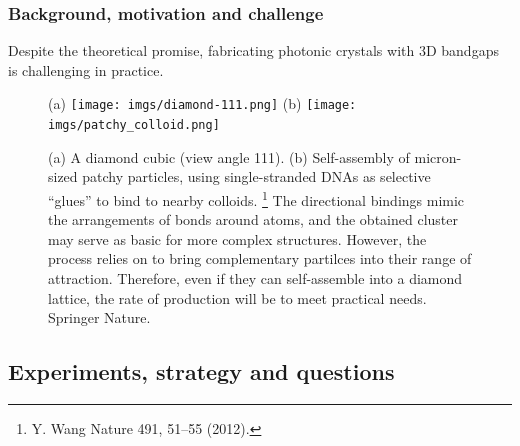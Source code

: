 \begin{frame}
  \frametitle{Background, motivation and challenge}

  Despite the theoretical promise, fabricating photonic crystals with 3D bandgaps is challenging in practice.
  \bigskip
  
  \begin{figure}
    \centering
    (a)
    \texttt{[image: imgs/diamond-111.png]}
    (b)
    \texttt{[image: imgs/patchy\_colloid.png]}
    \caption{(a) A diamond cubic (view angle 111).
      (b) Self-assembly of micron-sized patchy particles, using single-stranded DNAs as selective ``glues'' to bind to nearby colloids.%
      \footnote{Y. Wang \etal Nature 491, 51–55 (2012).}
      The directional bindings mimic the arrangements of bonds around atoms,
      and the obtained cluster may serve as basic  for more complex structures.
      However, the process relies on  to bring complementary partilces into their range of attraction.
      Therefore, even if they can self-assemble into a diamond lattice, the rate of production will be  to meet practical needs.
      \textcopyright \enspace Springer Nature.}
    \label{fig:diamond-struct}
  \end{figure}

\end{frame}

\hypertarget{experiment}{%
  \subsection{Experiments, strategy and questions}}

